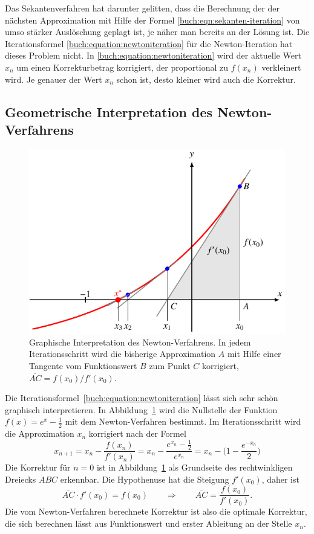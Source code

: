 Das Sekantenverfahren hat darunter gelitten, dass die Berechnung
der der nächsten Approximation mit Hilfe der Formel 
\eqref{buch:eqn:sekanten-iteration} von umso stärker Auslöschung
geplagt ist, je näher man bereits an der Lösung ist.
Die Iterationsformel
\eqref{buch:equation:newtoniteration}
für die Newton-Iteration hat dieses Problem nicht.
In \eqref{buch:equation:newtoniteration} wird der aktuelle Wert $x_n$
um einen Korrekturbetrag korrigiert, der proportional zu $f(x_n)$
verkleinert wird.
Je genauer der Wert $x_n$ schon ist, desto kleiner wird auch die
Korrektur.

%
%
\subsection{Geometrische Interpretation des Newton-Verfahrens}
\begin{figure}
\centering
\includegraphics{chapters/20-gleichungen/figures/newton.pdf}
\caption{Graphische Interpretation des Newton-Verfahrens.
In jedem Iterationsschritt wird die bisherige Approximation $A$
mit Hilfe einer Tangente vom Funktionswert $B$ zum Punkt $C$
korrigiert, $\overline{AC}=f(x_0)/f'(x_0)$.
\label{buch:figure:newton}}
\end{figure}
Die Iterationsformel~\eqref{buch:equation:newtoniteration}
lässt sich sehr schön graphisch interpretieren.
In Abbildung~\ref{buch:figure:newton} wird die Nullstelle der
Funktion $f(x) = e^x-\frac12$ mit dem Newton-Verfahren bestimmt.
Im Iterationsschritt wird die Approximation $x_n$ korrigiert
nach der Formel
\[
x_{n+1}
=
x_n - \frac{f(x_n)}{f'(x_n)}
=
x_n - \frac{e^{x_n}-\frac12}{e^{x_n}}
=
x_n - \biggl(1 -\frac{e^{-x_n}}{2}\biggr)
\]
Die Korrektur für $n=0$ ist in Abbildung~\ref{buch:figure:newton}
als Grundseite des rechtwinkligen Dreiecks $ABC$ erkennbar.
Die Hypothenuse hat die Steigung $f'(x_0)$, daher ist
\[
\overline{AC}\cdot f'(x_0) = f(x_0)
\qquad\Rightarrow\qquad
\overline{AC} = \frac{f(x_0)}{f'(x_0)}.
\]
Die vom Newton-Verfahren berechnete Korrektur ist also die optimale
Korrektur, die sich berechnen lässt aus Funktionswert und erster Ableitung
an der Stelle $x_n$.

